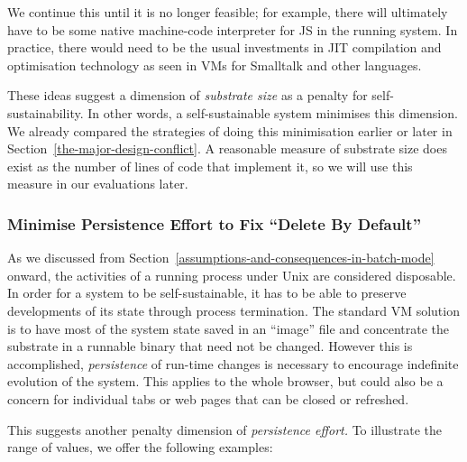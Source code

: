 \documentclass[ twoside,openright,titlepage,numbers=noenddot,headinclude,footinclude,cleardoublepage=empty,abstract=on,
                BCOR=5mm,paper=a4,fontsize=11pt
                ]{scrreprt}
\theoremstyle{definition}
\begin{document}
We continue this until it is no longer feasible; for example, there will
ultimately have to be some native machine-code interpreter for \ac{JS}
in the running system. In practice, there would need to be the usual
investments in JIT compilation and optimisation technology as seen in
VMs for Smalltalk and other languages.

These ideas suggest a dimension of \emph{substrate size} as a penalty
for self-sustainability. In other words, a self-sustainable system
minimises this dimension. We already compared the strategies of doing
this minimisation earlier or later in
Section~\ref{the-major-design-conflict}. A reasonable measure of
substrate size does exist as the number of lines of code that implement
it, so we will use this measure in our evaluations later.

\hypertarget{minimise-persistence-effort-to-fix-delete-by-default}{\subsubsection{Minimise Persistence Effort to Fix ``Delete By
Default''}\label{minimise-persistence-effort-to-fix-delete-by-default}}

As we discussed from
Section~\ref{assumptions-and-consequences-in-batch-mode} onward, the
activities of a running process under Unix are considered disposable. In
order for a system to be self-sustainable, it has to be able to preserve
developments of its state through process termination. The standard VM
solution is to have most of the system state saved in an ``image'' file
and concentrate the substrate in a runnable binary that need not be
changed. However this is accomplished, \emph{persistence} of run-time
changes is necessary to encourage indefinite evolution of the system.
This applies to the whole browser, but could also be a concern for
individual tabs or web pages that can be closed or refreshed.

This suggests another penalty dimension of \emph{persistence effort.} To
illustrate the range of values, we offer the following examples:
\end{document}
